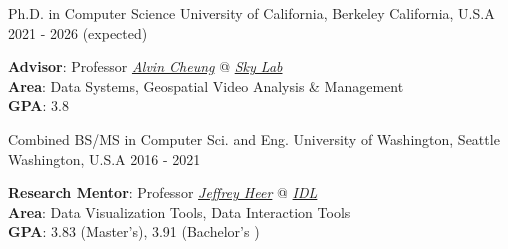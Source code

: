 
\begin{cventries}

\vspace{-4.0mm}
\begin{multicols}{2}

  \cventrycol
    {Ph.D. in Computer Science} %
    {University of California, Berkeley} %
    {California, U.S.A} %
    {2021 - 2026 (expected)} %
    {
      \vspace{-4.0mm}
      \begin{justify}
        \textbf{Advisor}: Professor \href{https://people.eecs.berkeley.edu/~akcheung/}{\textit{Alvin Cheung}} @ \href{https://sky.cs.berkeley.edu/}{\textit{Sky Lab}}\\
        \textbf{Area}: Data Systems, Geospatial Video Analysis \& Management\\
        \textbf{GPA}: 3.8
      \end{justify}
    }
  \cventrycol
    {Combined BS/MS in Computer Sci. and Eng.} %
    {University of Washington, Seattle} %
    {Washington, U.S.A} %
    {2016 - 2021} %
    {
      \vspace{-4.0mm}
      \begin{justify}
        \textbf{Research Mentor}: Professor \href{https://homes.cs.washington.edu/~jheer/}{\textit{Jeffrey Heer}} @ \href{https://idl.cs.washington.edu/}{\textit{IDL}}\\
        \textbf{Area}: Data Visualization Tools, Data Interaction Tools\\
        \textbf{GPA}: 3.83 (Master's), 3.91 (Bachelor's )
      \end{justify}
    }
\end{multicols}
\vspace{-8mm}
\end{cventries}
